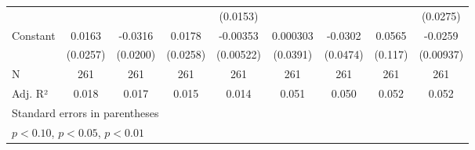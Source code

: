 {\begin{tabular}{l*{8}{c}}
                    &                     &                     &                     &    (0.0153)         &                     &                     &                     &    (0.0275)         \\
Constant            &      0.0163         &     -0.0316         &      0.0178         &    -0.00353         &    0.000303         &     -0.0302         &      0.0565         &     -0.0259\sym{***}\\
                    &    (0.0257)         &    (0.0200)         &    (0.0258)         &   (0.00522)         &    (0.0391)         &    (0.0474)         &     (0.117)         &   (0.00937)         \\
\hline
N                   &         261         &         261         &         261         &         261         &         261         &         261         &         261         &         261         \\
Adj. R²             &       0.018         &       0.017         &       0.015         &       0.014         &       0.051         &       0.050         &       0.052         &       0.052         \\
\hline\hline
\multicolumn{9}{l}{\footnotesize Standard errors in parentheses}\\
\multicolumn{9}{l}{\footnotesize \sym{*} \(p<0.10\), \sym{**} \(p<0.05\), \sym{***} \(p<0.01\)}\\
\end{tabular}
}

